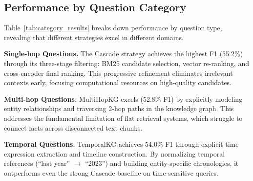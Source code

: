 \subsection{Performance by Question Category}

Table~\ref{tab:category_results} breaks down performance by question type, revealing that different strategies excel in different domains.

\begin{table}[ht]
\centering
\caption{F1 scores by question category. Best per category in bold.}
\label{tab:category_results}
\end{table}

\textbf{Single-hop Questions.} The Cascade strategy achieves the highest F1 (55.2\%) through its three-stage filtering: BM25 candidate selection, vector re-ranking, and cross-encoder final ranking. This progressive refinement eliminates irrelevant contexts early, focusing computational resources on high-quality candidates.

\textbf{Multi-hop Questions.} MultiHopKG excels (52.8\% F1) by explicitly modeling entity relationships and traversing 2-hop paths in the knowledge graph. This addresses the fundamental limitation of flat retrieval systems, which struggle to connect facts across disconnected text chunks.

\textbf{Temporal Questions.} TemporalKG achieves 54.0\% F1 through explicit time expression extraction and timeline construction. By normalizing temporal references (``last year'' $\rightarrow$ ``2023'') and building entity-specific chronologies, it outperforms even the strong Cascade baseline on time-sensitive queries.

